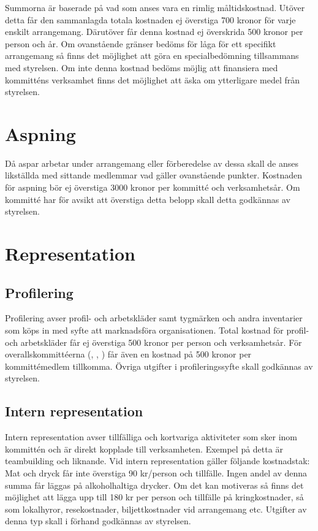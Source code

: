 \documentclass[11pt, includeaddress]{../../classes/cthit}
\begin{document}
\addvbuffer[\the\baselineskip]{\begin{tabular}{ l  c  c  c  c}
	\centering
	Timmar & [0-5) & (5-9] & (9-13] & (13-24] \\
	\hline
	Kronor & 0 & 30 & 60 & 90 \\
\end{tabular}}

Summorna är baserade på vad som anses vara en rimlig måltidskostnad. Utöver detta får den sammanlagda totala kostnaden ej överstiga 700 kronor för varje enskilt arrangemang. Därutöver får denna kostnad ej överskrida 500 kronor per person och år. Om ovanstående gränser bedöms för låga för ett specifikt arrangemang så finns det möjlighet att göra en specialbedömning tillsammans med styrelsen. Om inte denna kostnad bedöms möjlig att finansiera med kommitténs verksamhet finns det möjlighet att äska om ytterligare medel från styrelsen. 


\section{Aspning}
Då aspar arbetar under arrangemang eller förberedelse av dessa skall de anses likställda med sittande medlemmar vad gäller ovanstående punkter. Kostnaden för aspning bör ej överstiga 3000 kronor per kommitté och verksamhetsår. Om kommitté har för avsikt att överstiga detta belopp skall detta godkännas av styrelsen.


\section{Representation}

\subsection{Profilering}
Profilering avser profil- och arbetskläder samt tygmärken och andra inventarier som köps in med syfte att marknadsföra organisationen. Total kostnad för profil- och arbetskläder får ej överstiga 500 kronor per person och verksamhetsår. För overallskommittéerna (\NOLLKIT, \PRIT, \SEXIT) får även en kostnad på 500 kronor per kommittémedlem tillkomma. Övriga utgifter i profileringssyfte skall godkännas av styrelsen. 

\subsection{Intern representation}
Intern representation avser tillfälliga och kortvariga aktiviteter som sker inom kommittén och är direkt kopplade till verksamheten. Exempel på detta är teambuilding och liknande. Vid intern representation gäller följande kostnadstak: Mat och dryck får inte överstiga 90 kr/person och tillfälle. Ingen andel av denna summa får läggas på alkoholhaltiga drycker. Om det kan motiveras så finns det möjlighet att lägga upp till 180 kr per person och tillfälle på kringkostnader, så som lokalhyror, resekostnader, biljettkostnader vid arrangemang etc. Utgifter av denna typ skall i förhand godkännas av styrelsen.
\end{document}
